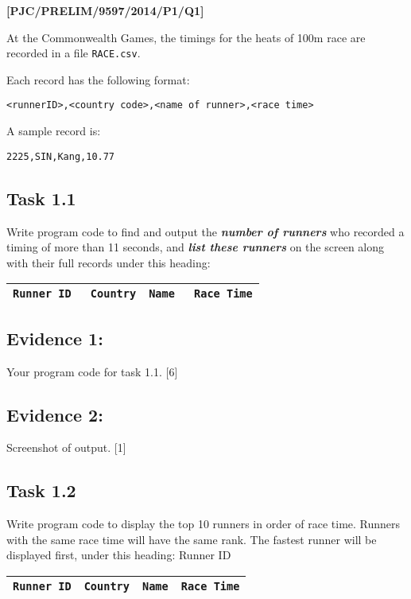 \item \textbf{{[}PJC/PRELIM/9597/2014/P1/Q1{]} }

At the Commonwealth Games, the timings for the heats of 100m race
are recorded in a file \texttt{RACE.csv}. 

Each record has the following format: 
\noindent \begin{center}
\texttt{<runnerID>,<country code>,<name of runner>,<race time> }
\par\end{center}

A sample record is: 
\noindent \begin{center}
\texttt{2225,SIN,Kang,10.77} 
\par\end{center}

\subsection*{Task 1.1 }

Write program code to find and output the \textbf{\emph{number of
runners}} who recorded a timing of more than 11 seconds, and \textbf{\emph{list
these runners}} on the screen along with their full records under
this heading: 
\noindent \begin{center}
\texttt{}%
\begin{tabular}{|cccc|}
\hline 
\texttt{Runner ID } & \texttt{Country} & \texttt{Name } & \texttt{Race Time}\tabularnewline
\hline 
\end{tabular}
\par\end{center}

\subsection*{Evidence 1: }

Your program code for task 1.1. \hfill{}{[}6{]}

\subsection*{Evidence 2: }

Screenshot of output. \hfill{}{[}1{]}

\subsection*{Task 1.2 }

Write program code to display the top 10 runners in order of race
time. Runners with the same race time will have the same rank. The
fastest runner will be displayed first, under this heading: Runner
ID 
\noindent \begin{center}
\texttt{}%
\begin{tabular}{|cccc|}
\hline 
\texttt{Runner ID} & \texttt{Country} & \texttt{Name} & \texttt{Race Time}\tabularnewline
\hline 
\end{tabular}
\par\end{center}

